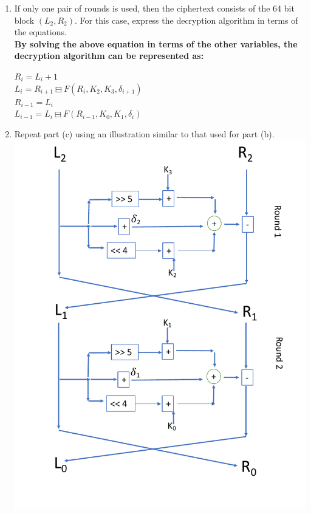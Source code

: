 \documentclass[12pt]{article}
\begin{document}
\begin{enumerate}
\begin{enumerate}
  \item {If only one pair of rounds is used, then the ciphertext consists of the 64 bit block $(L_2, R_2)$. For this case, express the decryption algorithm in terms of the equations.} \\

  \textbf{By solving the above equation in terms of the other variables, the decryption algorithm can be represented as:}
  \begin{center}
  $R_i = L_i + 1$\\
  $L_i = R_{i+1} \boxminus F(R_i, K_2, K_3, \delta_{i+1})$\\
  $R_{i-1} = L_i$\\
  $L_{i-1} = L_i \boxminus F(R_{i-1}, K_0, K_1, \delta_i)$
  \end{center}

  \item{Repeat part (c) using an illustration similar to that used for part (b).} \\

  \includegraphics[scale=0.5]{decryption.pdf}


\end{enumerate}
\end{enumerate}
\end{document}

